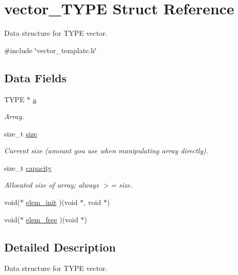 \hypertarget{structvector___t_y_p_e}{\section{vector\-\_\-\-T\-Y\-P\-E Struct Reference}
\label{structvector___t_y_p_e}
}


Data structure for T\-Y\-P\-E vector.  




{\ttfamily \#include \char`\"{}vector\-\_\-template.\-h\char`\"{}}

\subsection*{Data Fields}
\begin{DoxyCompactItemize}
\item 
T\-Y\-P\-E $\ast$ \hyperlink{structvector___t_y_p_e_a4462761169011ea7e4085eef5a3f2d12}{a}
\begin{DoxyCompactList}\small\item\em Array. \end{DoxyCompactList}\item 
size\-\_\-t \hyperlink{structvector___t_y_p_e_a5c187692d3e0d1659d7024a751ec4b4d}{size}
\begin{DoxyCompactList}\small\item\em Current size (amount you use when manipulating array directly). \end{DoxyCompactList}\item 
size\-\_\-t \hyperlink{structvector___t_y_p_e_aa2f337cea7d3cb1e1ed4f5ee5a22678f}{capacity}
\begin{DoxyCompactList}\small\item\em Allocated size of array; always $>$= size. \end{DoxyCompactList}\item 
void($\ast$ \hyperlink{structvector___t_y_p_e_acc422333d8ea0e69a98f9016019a7b09}{elem\-\_\-init} )(void $\ast$, void $\ast$)
\item 
void($\ast$ \hyperlink{structvector___t_y_p_e_a0ebd337f312279fe2fb82e7a879f6456}{elem\-\_\-free} )(void $\ast$)
\end{DoxyCompactItemize}


\subsection{Detailed Description}
Data structure for T\-Y\-P\-E vector. 

